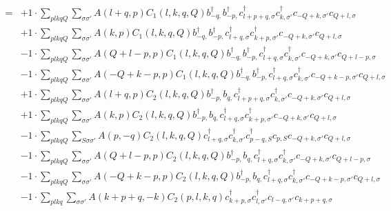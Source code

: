 \begin{align*}
	[\eta, H'] = 	&+1 \cdot \sum_{ p l k q Q } \sum_{ \sigma \sigma' } A( l+q, p )  C_1( l, k, q, Q )   b_{ -q, }^\dagger  b_{ -p, }^\dagger  c_{ l+p+q, \sigma }^\dagger  c_{ k, \sigma' }^\dagger  c_{ -Q+k, \sigma' } c_{ Q+l, \sigma }  \\
	&+1 \cdot \sum_{ p l k q Q } \sum_{ \sigma \sigma' } A( k, p )  C_1( l, k, q, Q )   b_{ -q, }^\dagger  b_{ -p, }^\dagger  c_{ l+q, \sigma }^\dagger  c_{ k+p, \sigma' }^\dagger  c_{ -Q+k, \sigma' } c_{ Q+l, \sigma }  \\
	&-1 \cdot \sum_{ p l k q Q } \sum_{ \sigma \sigma' } A( Q+l-p, p )  C_1( l, k, q, Q )   b_{ -q, }^\dagger  b_{ -p, }^\dagger  c_{ l+q, \sigma }^\dagger  c_{ k, \sigma' }^\dagger  c_{ -Q+k, \sigma' } c_{ Q+l-p, \sigma }  \\
	&-1 \cdot \sum_{ p l k q Q } \sum_{ \sigma \sigma' } A( -Q+k-p, p )  C_1( l, k, q, Q )   b_{ -q, }^\dagger  b_{ -p, }^\dagger  c_{ l+q, \sigma }^\dagger  c_{ k, \sigma' }^\dagger  c_{ -Q+k-p, \sigma' } c_{ Q+l, \sigma }  \\
	&+1 \cdot \sum_{ p l k q Q } \sum_{ \sigma \sigma' } A( l+q, p )  C_2( l, k, q, Q )   b_{ -p, }^\dagger  b_{ q, } c_{ l+p+q, \sigma }^\dagger  c_{ k, \sigma' }^\dagger  c_{ -Q+k, \sigma' } c_{ Q+l, \sigma }  \\
	&+1 \cdot \sum_{ p l k q Q } \sum_{ \sigma \sigma' } A( k, p )  C_2( l, k, q, Q )   b_{ -p, }^\dagger  b_{ q, } c_{ l+q, \sigma }^\dagger  c_{ k+p, \sigma' }^\dagger  c_{ -Q+k, \sigma' } c_{ Q+l, \sigma }  \\
	&-1 \cdot \sum_{ p l k q Q } \sum_{ S \sigma \sigma' } A( p, -q )  C_2( l, k, q, Q )   c_{ l+q, \sigma }^\dagger  c_{ k, \sigma' }^\dagger  c_{ p-q, S }^\dagger  c_{ p, S } c_{ -Q+k, \sigma' } c_{ Q+l, \sigma }  \\
	&-1 \cdot \sum_{ p l k q Q } \sum_{ \sigma \sigma' } A( Q+l-p, p )  C_2( l, k, q, Q )   b_{ -p, }^\dagger  b_{ q, } c_{ l+q, \sigma }^\dagger  c_{ k, \sigma' }^\dagger  c_{ -Q+k, \sigma' } c_{ Q+l-p, \sigma }  \\
	&-1 \cdot \sum_{ p l k q Q } \sum_{ \sigma \sigma' } A( -Q+k-p, p )  C_2( l, k, q, Q )   b_{ -p, }^\dagger  b_{ q, } c_{ l+q, \sigma }^\dagger  c_{ k, \sigma' }^\dagger  c_{ -Q+k-p, \sigma' } c_{ Q+l, \sigma }  \\
	&-1 \cdot \sum_{ p l k q } \sum_{ \sigma \sigma' } A( k+p+q, -k )  C_2( p, l, k, q )   c_{ k+p, \sigma }^\dagger  c_{ l, \sigma' }^\dagger  c_{ l-q, \sigma' } c_{ k+p+q, \sigma }  \\

\end{align*}
